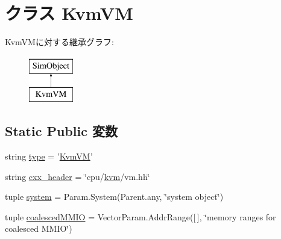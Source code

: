 \hypertarget{classKvmVM_1_1KvmVM}{
\section{クラス KvmVM}
\label{classKvmVM_1_1KvmVM}
}
KvmVMに対する継承グラフ:\begin{figure}[H]
\begin{center}
\leavevmode
\includegraphics[height=2cm]{classKvmVM_1_1KvmVM}
\end{center}
\end{figure}
\subsection*{Static Public 変数}
\begin{DoxyCompactItemize}
\item 
string \hyperlink{classKvmVM_1_1KvmVM_acce15679d830831b0bbe8ebc2a60b2ca}{type} = '\hyperlink{classKvmVM_1_1KvmVM}{KvmVM}'
\item 
string \hyperlink{classKvmVM_1_1KvmVM_a17da7064bc5c518791f0c891eff05fda}{cxx\_\-header} = \char`\"{}cpu/\hyperlink{classKvmVM_a4169de9bdb8aa1afbeed2acc231dbb7f}{kvm}/vm.hh\char`\"{}
\item 
tuple \hyperlink{classKvmVM_1_1KvmVM_ab737471139f5a296e5b26e8a0e1b0744}{system} = Param.System(Parent.any, \char`\"{}system object\char`\"{})
\item 
tuple \hyperlink{classKvmVM_1_1KvmVM_adb9506ca4d77eb0367380cdde678f978}{coalescedMMIO} = VectorParam.AddrRange(\mbox{[}$\,$\mbox{]}, \char`\"{}memory ranges for coalesced MMIO\char`\"{})
\end{DoxyCompactItemize}


